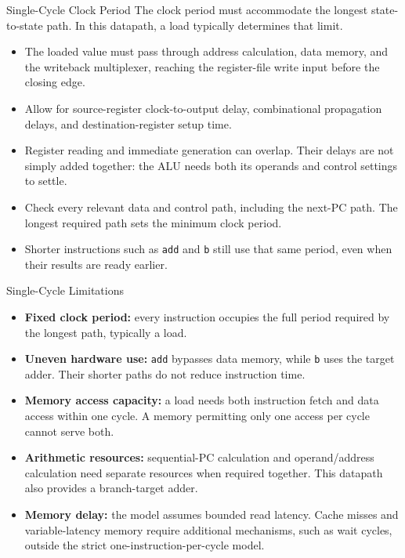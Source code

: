 \documentclass[aspectratio=169,11pt,t]{beamer}
\newcommand{\key}[1]{\textbf{#1}}
\newcommand{\code}[1]{\texttt{#1}}
\begin{document}
\begin{frame}{Single-Cycle Clock Period}
\normalsize
The clock period must accommodate the longest state-to-state path. In this datapath, a load typically determines that limit.
\vspace{.18cm}
\begin{itemize}\setlength{\itemsep}{8pt}
\item The loaded value must pass through address calculation, data memory, and the writeback multiplexer, reaching the register-file write input before the closing edge.
\item Allow for source-register clock-to-output delay, combinational propagation delays, and destination-register setup time.
\item Register reading and immediate generation can overlap. Their delays are not simply added together: the ALU needs both its operands and control settings to settle.
\item Check every relevant data and control path, including the next-PC path. The longest required path sets the minimum clock period.
\item Shorter instructions such as \code{add} and \code{b} still use that same period, even when their results are ready earlier.
\end{itemize}
\end{frame}

\begin{frame}{Single-Cycle Limitations}
\normalsize
\begin{itemize}\setlength{\itemsep}{8pt}
\item \key{Fixed clock period:} every instruction occupies the full period required by the longest path, typically a load.
\item \key{Uneven hardware use:} \code{add} bypasses data memory, while \code{b} uses the target adder. Their shorter paths do not reduce instruction time.
\item \key{Memory access capacity:} a load needs both instruction fetch and data access within one cycle. A memory permitting only one access per cycle cannot serve both.
\item \key{Arithmetic resources:} sequential-PC calculation and operand/address calculation need separate resources when required together. This datapath also provides a branch-target adder.
\item \key{Memory delay:} the model assumes bounded read latency. Cache misses and variable-latency memory require additional mechanisms, such as wait cycles, outside the strict one-instruction-per-cycle model.
\end{itemize}
\end{frame}
\end{document}
